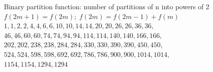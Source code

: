 Binary partition function: number of partitions of n into powers of 2 \\
$f(2m+1)=f(2m); \; f(2m)=f(2m-1)+f(m)$\\
$1,1,2,2,4,4,6,6,10,10,14,14,20,20,26,26,36,36,$\\
$46,46,60,60,74,74,94,94,114,114,140,140,166,166,$\\
$202,202,238,238,284,284,330,330,390,390,450,450,$\\
$524,524,598,598,692,692,786,786,900,900,1014,1014,$\\
$1154,1154,1294,1294$
